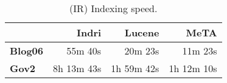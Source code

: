 \begin{table}[t]
\centering
{\small
\begin{tabular}{|l|r|r|r|}
        \hline & \textbf{Indri} & \textbf{Lucene} & \textbf{MeTA} \\
        \hline
        \textbf{Blog06} & 55m 40s & 20m 23s & 11m 23s \\
        \textbf{Gov2}   & 8h 13m 43s & 1h 59m 42s & 1h 12m 10s \\
        \hline
\end{tabular}
\caption{(IR) Indexing speed.}
\label{table:ir-indexing}
}
\end{table}
